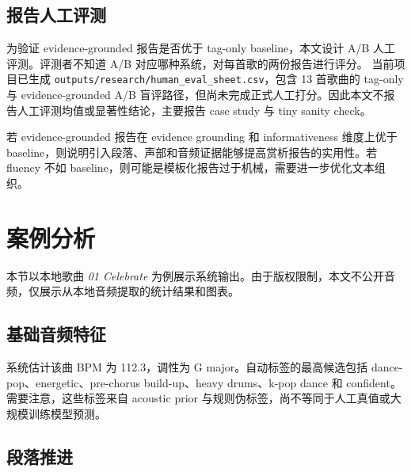\documentclass[UTF8,zihao=-4]{ctexart}
\begin{document}
\subsection{报告人工评测}

为验证 evidence-grounded 报告是否优于 tag-only baseline，本文设计 A/B 人工评测。评测者不知道 A/B 对应哪种系统，对每首歌的两份报告进行评分。
当前项目已生成 \texttt{outputs/research/human\_eval\_sheet.csv}，包含 13 首歌曲的 tag-only 与 evidence-grounded A/B 盲评路径，但尚未完成正式人工打分。因此本文不报告人工评测均值或显著性结论，主要报告 case study 与 tiny sanity check。

\begin{table}[H]
\centering
\caption{人工评测结果模板（A/B 表已生成，分数待人工填写）。}
\label{tab:human_eval}
\scriptsize
{}
\end{table}

若 evidence-grounded 报告在 evidence grounding 和 informativeness 维度上优于 baseline，则说明引入段落、声部和音频证据能够提高赏析报告的实用性。若 fluency 不如 baseline，则可能是模板化报告过于机械，需要进一步优化文本组织。

\section{案例分析}

本节以本地歌曲 \textit{01 Celebrate} 为例展示系统输出。由于版权限制，本文不公开音频，仅展示从本地音频提取的统计结果和图表。

\subsection{基础音频特征}

系统估计该曲 BPM 为 112.3，调性为 G major。自动标签的最高候选包括 dance-pop、energetic、pre-chorus build-up、heavy drums、k-pop dance 和 confident。需要注意，这些标签来自 acoustic prior 与规则伪标签，尚不等同于人工真值或大规模训练模型预测。

\subsection{段落推进}
\end{document}
